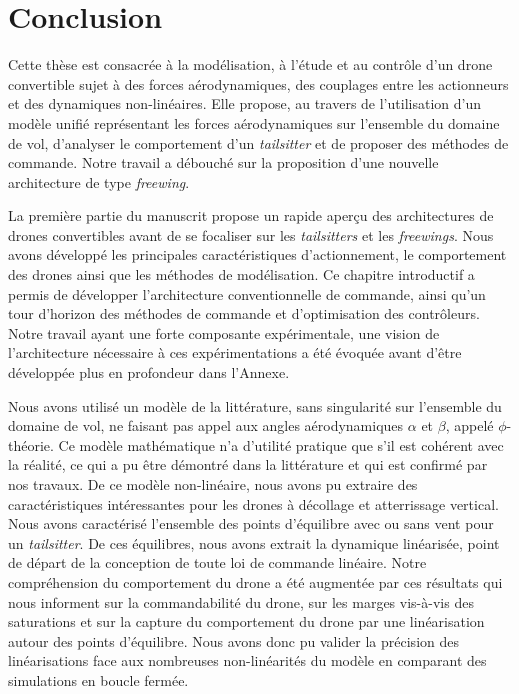 \chapter*{Conclusion}

\renewcommand{\thefigure}{C.\arabic{figure}}
\setcounter{figure}{0} %

Cette thèse est consacrée à la modélisation, à l'étude et au contrôle d'un drone convertible sujet à des forces aérodynamiques, des couplages entre les actionneurs et des dynamiques non-linéaires. Elle propose, au travers de l'utilisation d'un modèle unifié représentant les forces aérodynamiques sur l'ensemble du domaine de vol, d'analyser le comportement d'un \textit{tailsitter} et de proposer des méthodes de commande. Notre travail a débouché sur la proposition d'une nouvelle architecture de type \textit{freewing}.

La première partie du manuscrit propose un rapide aperçu des architectures de drones convertibles avant de se focaliser sur les \textit{tailsitters} et les \textit{freewings}. Nous avons développé les principales caractéristiques d'actionnement, le comportement des drones ainsi que les méthodes de modélisation. Ce chapitre introductif a permis de développer l'architecture conventionnelle de commande, ainsi qu'un tour d'horizon des méthodes de commande et d'optimisation des contrôleurs. Notre travail ayant une forte composante expérimentale, une vision de l'architecture nécessaire à ces expérimentations a été évoquée avant d'être développée plus en profondeur dans l'Annexe.  

Nous avons utilisé un modèle de la littérature, sans singularité sur l'ensemble du domaine de vol, ne faisant pas appel aux angles aérodynamiques $\alpha$ et $\beta$, appelé $\phi$-théorie. Ce modèle mathématique n'a d'utilité pratique que s'il est cohérent avec la réalité, ce qui a pu être démontré dans la littérature et qui est confirmé par nos travaux. De ce modèle non-linéaire, nous avons pu extraire des caractéristiques intéressantes pour les drones à décollage et atterrissage vertical. 
Nous avons caractérisé l'ensemble des points d'équilibre avec ou sans vent pour un \textit{tailsitter}. De ces équilibres, nous avons extrait la dynamique linéarisée, point de départ de la conception de toute loi de commande linéaire. Notre compréhension du comportement du drone a été augmentée par ces résultats qui nous informent sur la commandabilité du drone, sur les marges vis-à-vis des saturations et sur la capture du comportement du drone par une linéarisation autour des points d'équilibre. Nous avons donc pu valider la précision des linéarisations face aux nombreuses non-linéarités du modèle en comparant des simulations en boucle fermée. 

